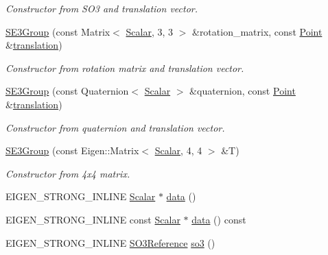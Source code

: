 \begin{DoxyCompactItemize}
\begin{DoxyCompactList}\small\item\em Constructor from S\+O3 and translation vector. \end{DoxyCompactList}\item 
\hyperlink{class_sophus_1_1_s_e3_group_a42189335d07e84cee3cd11edd0be3f51}{S\+E3\+Group} (const Matrix$<$ \hyperlink{class_sophus_1_1_s_e3_group_a8b19ef5ffe83465341b619047581219e}{Scalar}, 3, 3 $>$ \&rotation\+\_\+matrix, const \hyperlink{class_sophus_1_1_s_e3_group_ab2257f9298559ef83bbeffd386a50e1d}{Point} \&\hyperlink{class_sophus_1_1_s_e3_group_a1bfd300de4529a2f6ba0ff5baecea98e}{translation})
\begin{DoxyCompactList}\small\item\em Constructor from rotation matrix and translation vector. \end{DoxyCompactList}\item 
\hyperlink{class_sophus_1_1_s_e3_group_a6e7a59c8c3a5c6e03cad11523e24f324}{S\+E3\+Group} (const Quaternion$<$ \hyperlink{class_sophus_1_1_s_e3_group_a8b19ef5ffe83465341b619047581219e}{Scalar} $>$ \&quaternion, const \hyperlink{class_sophus_1_1_s_e3_group_ab2257f9298559ef83bbeffd386a50e1d}{Point} \&\hyperlink{class_sophus_1_1_s_e3_group_a1bfd300de4529a2f6ba0ff5baecea98e}{translation})
\begin{DoxyCompactList}\small\item\em Constructor from quaternion and translation vector. \end{DoxyCompactList}\item 
\hyperlink{class_sophus_1_1_s_e3_group_ac9e36fa0ac86157d295eab03fef14cb1}{S\+E3\+Group} (const Eigen\+::\+Matrix$<$ \hyperlink{class_sophus_1_1_s_e3_group_a8b19ef5ffe83465341b619047581219e}{Scalar}, 4, 4 $>$ \&T)
\begin{DoxyCompactList}\small\item\em Constructor from 4x4 matrix. \end{DoxyCompactList}\item 
E\+I\+G\+E\+N\+\_\+\+S\+T\+R\+O\+N\+G\+\_\+\+I\+N\+L\+I\+NE \hyperlink{class_sophus_1_1_s_e3_group_a8b19ef5ffe83465341b619047581219e}{Scalar} $\ast$ \hyperlink{class_sophus_1_1_s_e3_group_a52ddbe0bf8383170aeb3eef194f75b73}{data} ()
\item 
E\+I\+G\+E\+N\+\_\+\+S\+T\+R\+O\+N\+G\+\_\+\+I\+N\+L\+I\+NE const \hyperlink{class_sophus_1_1_s_e3_group_a8b19ef5ffe83465341b619047581219e}{Scalar} $\ast$ \hyperlink{class_sophus_1_1_s_e3_group_a9906f360399d0a02780008d25939a544}{data} () const 
\item 
E\+I\+G\+E\+N\+\_\+\+S\+T\+R\+O\+N\+G\+\_\+\+I\+N\+L\+I\+NE \hyperlink{class_sophus_1_1_s_e3_group_ab9e4d2988d5437bca541db659c76e1a1}{S\+O3\+Reference} \hyperlink{class_sophus_1_1_s_e3_group_a7c397c3a78893feeba4ec2034943b522}{so3} ()\hypertarget{class_sophus_1_1_s_e3_group_a7c397c3a78893feeba4ec2034943b522}{}\label{class_sophus_1_1_s_e3_group_a7c397c3a78893feeba4ec2034943b522}


\end{DoxyCompactItemize}
